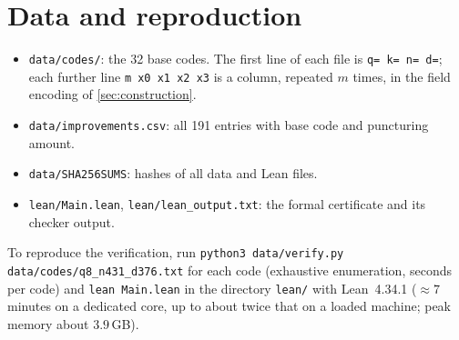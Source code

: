 \documentclass[11pt]{article}
\numberwithin{equation}{section}
\theoremstyle{definition}
\theoremstyle{remark}
\begin{document}
\section{Data and reproduction}\label{app:data}
\begin{itemize}
\item \texttt{data/codes/}: the 32 base codes. The first line of each file is \texttt{q= k= n= d=}; each
further line \texttt{m x0 x1 x2 x3} is a column, repeated $m$ times, in the field encoding of
\cref{sec:construction}.
\item \texttt{data/improvements.csv}: all 191 entries with base code and puncturing amount.
\item \texttt{data/SHA256SUMS}: hashes of all data and Lean files.
\item \texttt{lean/Main.lean}, \texttt{lean/lean\_output.txt}: the formal certificate and its checker
output.
\end{itemize}
To reproduce the verification, run \texttt{python3 data/verify.py data/codes/q8\_n431\_d376.txt} for
each code (exhaustive enumeration, seconds per code) and \texttt{lean Main.lean} in the directory
\texttt{lean/} with Lean~4.34.1 ($\approx 7$ minutes on a dedicated core, up to about twice that on a
loaded machine; peak memory about $3.9$\,GB).
\end{document}

